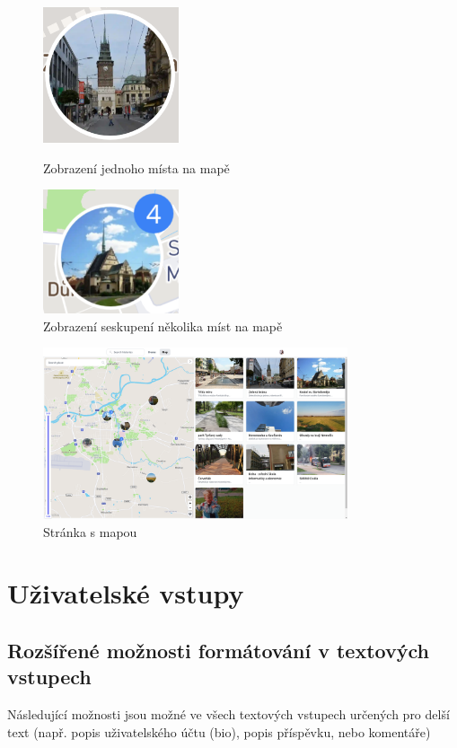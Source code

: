 \documentclass[12pt, a4paper,
 twoside,        %
 openright
]{report}
\begin{document}
\begin{figure}[!h]

	\centering
	\includegraphics[width=4cm]{images/place.png}
	\caption{Zobrazení jednoho místa na mapě}\label{figure:onePlaceOnMap}
	\includegraphics[width=4cm]{images/places_cluster.png}
	\caption{Zobrazení seskupení několika míst na mapě}\label{figure:clusterOnMap}

\end{figure}

\begin{figure}[h]
	\centering
	\includegraphics[width=0.8\textwidth]{images/map_page.png}
	\caption{Stránka s mapou}\label{figure:mapPagePreview}
\end{figure}


\section{Uživatelské vstupy}
\subsection{Rozšířené možnosti formátování v textových vstupech}
Následující možnosti jsou možné ve všech textových vstupech určených pro delší text (např. popis uživatelského účtu (bio), popis příspěvku, nebo komentáře)
\end{document}
